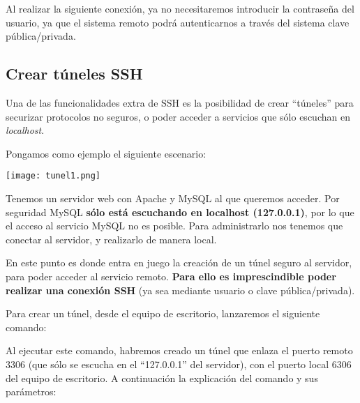 Al realizar la siguiente conexión, ya no necesitaremos introducir la contraseña del usuario, ya que el sistema remoto podrá autenticarnos a través del sistema clave pública/privada.


\subsection{Crear túneles SSH}
Una de las funcionalidades extra de SSH es la posibilidad de crear “túneles” para securizar protocolos no seguros, o poder acceder a servicios que sólo escuchan en \textit{localhost}.

Pongamos como ejemplo el siguiente escenario:

\vspace{-15pt}
\begin{center}
    \texttt{[image: tunel1.png]}
\end{center}
\vspace{-15pt}

Tenemos un servidor web con Apache y MySQL al que queremos acceder. Por seguridad MySQL \textbf{sólo está escuchando en localhost (127.0.0.1)}, por lo que el acceso al servicio MySQL no es posible. Para administrarlo nos tenemos que conectar al servidor, y realizarlo de manera local.

En este punto es donde entra en juego la creación de un túnel seguro al servidor, para poder acceder al servicio remoto. \textbf{Para ello es imprescindible poder realizar una conexión SSH} (ya sea mediante usuario o clave pública/privada).

Para crear un túnel, desde el equipo de escritorio, lanzaremos el siguiente comando:


Al ejecutar este comando, habremos creado un túnel que enlaza el puerto remoto 3306 (que sólo se escucha en el “127.0.0.1” del servidor), con el puerto local 6306 del equipo de escritorio. A continuación la explicación del comando y sus parámetros:


